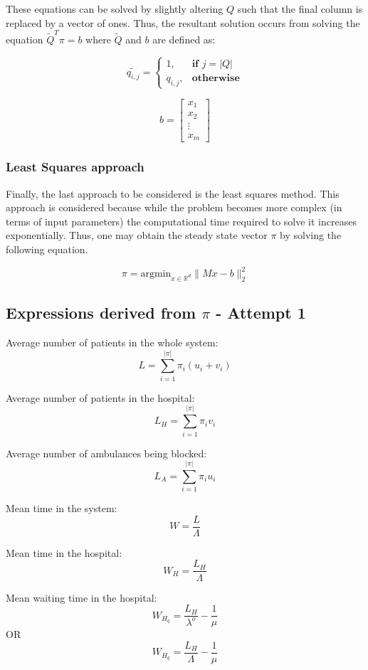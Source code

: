 \documentclass{article}
\begin{document}
These equations can be solved by slightly altering \( Q \) such that the final column is replaced by a vector of ones. Thus, the resultant solution occurs from solving the equation \( \tilde{Q}^T \pi = b \) where \( \tilde{Q} \) and \( b \) are defined as:

\[
\tilde{q_{i, j}} = 
\begin{cases}
    1, & \textbf{if } j = |Q| \\
    q_{i,j}, & \textbf{otherwise}
\end{cases}
\]

\[
b = 
\begin{bmatrix}
    x_{1} \\
    x_{2} \\
    \vdots \\
    x_{m}
\end{bmatrix}
\]


\subsubsection{Least Squares approach}
Finally, the last approach to be considered is the least squares method. This approach is considered because while the problem becomes more complex (in terms of input parameters) the computational time required to solve it increases exponentially. Thus, one may obtain the steady state vector \( \pi \) by solving the following equation.

\[
\pi = \text{argmin}_{x\in\mathbb{R}^{d}}\|Mx-b\|_2^2
\]


\newpage
\subsection{Expressions derived from \( \pi \) - Attempt 1}
Average number of patients in the whole system: 
\[
L = \sum_{i=1}^{|\pi|} \pi_i (u_i + v_i)
\] 

Average number of patients in the hospital: 
\[
L_H = \sum_{i=1}^{|\pi|} \pi_i v_i
\] 

Average number of ambulances being blocked:
\[
L_A = \sum_{i=1}^{|\pi|} \pi_i u_i
\]

Mean time in the system:
\[
W = \frac{L}{\Lambda}
\]

Mean time in the hospital:
\[
W_H = \frac{L_H}{\Lambda}
\]

Mean waiting time in the hospital:
\[
W_{H_q} = \frac{L_H}{\lambda^o} - \frac{1}{\mu}
\]
\hspace{7.2cm} OR
\[
W_{H_q} = \frac{L_H}{\Lambda} - \frac{1}{\mu}
\]
\end{document}
